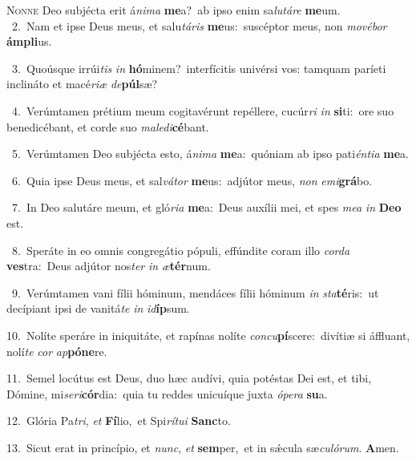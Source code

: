 \lettrine{\initial\textcolor{\initialcolor}{N}}{onne} Deo subjécta erit á\-\textit{ni}\-\textit{ma} \textbf{me}\-a?~\star ab ipso enim sa\-\textit{lu}\-\textit{tá}\textit{re} \textbf{me}\-um.\\
{\numbfont\textcolor{\numbcolor}{~2.}}~Nam et ipse Deus meus, et salu\-\textit{tá}\-\textit{ris} \textbf{me}\-us:~\star suscéptor meus, non \textit{mo}\-\textit{vé}\textit{bor} \textbf{ám}\-\textbf{pli}us.\par
{\numbfont\textcolor{\numbcolor}{~3.}}~Quoúsque irrúi\textit{tis} \textit{in} \textbf{hó}\-minem?~\star interfícitis univérsi vos: tamquam paríeti inclináto et macé\-\textit{ri}\-\textit{æ} \textit{de}\-\textbf{púl}sæ?\par
{\numbfont\textcolor{\numbcolor}{~4.}}~Verúmtamen prétium meum cogitavérunt repéllere, cucúr\textit{ri} \textit{in} \textbf{si}\-ti:~\star ore suo benedicébant, et corde suo \textit{ma}\-\textit{le}\textit{di}\textbf{cé}bant.\par
{\numbfont\textcolor{\numbcolor}{~5.}}~Verúmtamen Deo subjécta esto, á\-\textit{ni}\-\textit{ma} \textbf{me}\-a:~\star quóniam ab ipso pati\-\textit{én}\-\textit{ti}\textit{a} \textbf{me}\-a.\par
{\numbfont\textcolor{\numbcolor}{~6.}}~Quia ipse Deus meus, et sal\-\textit{vá}\-\textit{tor} \textbf{me}\-us:~\star adjútor meus, \textit{non} \textit{e}\-\textit{mi}\textbf{grá}bo.\par
{\numbfont\textcolor{\numbcolor}{~7.}}~In Deo salutáre meum, et gló\-\textit{ri}\-\textit{a} \textbf{me}\-a:~\star Deus auxílii mei, et spes \textit{me}\-\textit{a} \textit{in} \textbf{De}\-\textbf{o} est.\par
{\numbfont\textcolor{\numbcolor}{~8.}}~Speráte in eo omnis congregátio pópuli, effúndite coram illo \textit{cor}\-\textit{da} \textbf{ves}\-tra:~\star Deus adjútor nos\textit{ter} \textit{in} \textit{æ}\-\textbf{tér}num.\par
{\numbfont\textcolor{\numbcolor}{~9.}}~Verúmtamen vani fílii hóminum, mendáces fílii hóminum \textit{in} \textit{sta}\-\textbf{té}ris:~\star ut decípiant ipsi de vanitá\textit{te} \textit{in} \textit{id}\-\textbf{íp}sum.\par
{\numbfont\textcolor{\numbcolor}{10.}}~Nolíte speráre in iniquitáte, et rapínas nolíte \textit{con}\-\textit{cu}\textbf{pí}scere:~\star divítiæ si áffluant, nolí\textit{te} \textit{cor} \textit{ap}\-\textbf{pó}\textbf{ne}re.\par
{\numbfont\textcolor{\numbcolor}{11.}}~Semel locútus est Deus, duo hæc audívi, quia potéstas Dei est, et tibi, Dómine, mi\-\textit{se}\-\textit{ri}\textbf{cór}dia:~\star quia tu reddes unicuíque juxta \textit{ó}\-\textit{pe}\textit{ra} \textbf{su}\-a.\par
{\numbfont\textcolor{\numbcolor}{12.}}~Glória Pa\-\textit{tri}\-, \textit{et} \textbf{Fí}\-lio,~\star et Spi\-\textit{rí}\-\textit{tu}\textit{i} \textbf{Sanc}\-to.\par
{\numbfont\textcolor{\numbcolor}{13.}}~Sicut erat in princípio, et \textit{nunc}\-, \textit{et} \textbf{sem}\-per,~\star et in sǽcula sæ\-\textit{cu}\-\textit{ló}\textit{rum}. \textbf{A}\-men.\par
